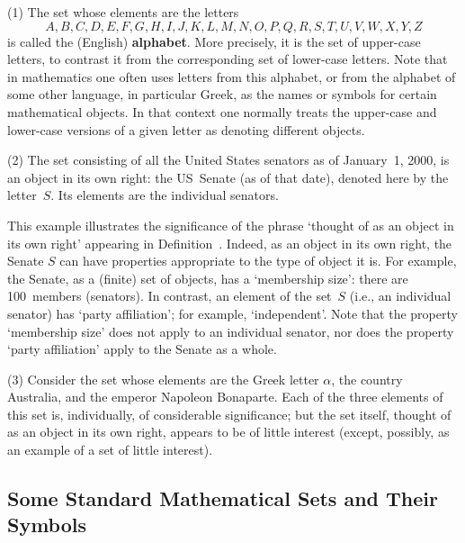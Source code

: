 \V

        (1) The set whose elements are the letters
        \begin{displaymath}
        A,B,C,D,E,F,G,H,I,J,K,L,M,N,O,P,Q,R,S,T,U,V,W,X,Y,Z
        \end{displaymath}
    is called the (English) {\bf alphabet}.
    More precisely, it is the set of upper-case letters, to contrast it from the corresponding set of lower-case letters.
    Note that in mathematics one often uses letters from this alphabet, or from the alphabet of some other language,
    in particular Greek, as the names or symbols for certain mathematical objects.
    In that context one normally treats the upper-case and lower-case versions of a given letter as denoting different objects.

\V

        (2) The set consisting of all the United States senators as of January~1, 2000,
    is an object in its own right: the US~Senate (as of that date), denoted here by the letter~$S$. Its elements are the individual senators.

        This example illustrates the significance of the phrase `thought of as an object in its own right' appearing in Definition~.
    Indeed, as an object in its own right, the Senate $S$ can have properties appropriate to the type of object it is.
    For example, the Senate, as a (finite) set of objects, has a `membership size': there are 100~members (senators).
    In contrast, an element of the set~$S$ (i.e., an individual senator) has `party affiliation'; for example, `independent'.
    Note that the property `membership size' does not apply to an individual senator, nor does the property `party affiliation' apply to the Senate as a whole.


\V

        (3) Consider the set whose elements are the Greek letter ${\alpha}$, the country Australia, and the emperor Napoleon Bonaparte.
    Each of the three elements of this set is, individually, of considerable significance;
    but the set itself, thought of as an object in its own right, appears to be of little interest (except, possibly, as an example of a set of little interest).

\V
\V

            \subsection{\small{\bf Some Standard Mathematical Sets and Their Symbols}}
            \label{ExampA10.06}

